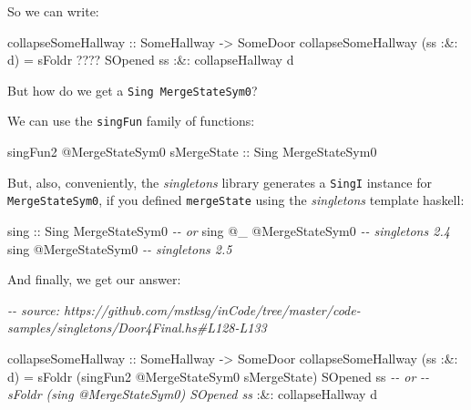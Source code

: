 \documentclass[]{article}
\newenvironment{Shaded}{}{}
\newcommand{\CommentTok}[1]{\textcolor[rgb]{0.38,0.63,0.69}{\textit{#1}}}
\newcommand{\DataTypeTok}[1]{\textcolor[rgb]{0.56,0.13,0.00}{#1}}
\newcommand{\NormalTok}[1]{#1}
\newcommand{\OperatorTok}[1]{\textcolor[rgb]{0.40,0.40,0.40}{#1}}
\newcommand{\OtherTok}[1]{\textcolor[rgb]{0.00,0.44,0.13}{#1}}
\begin{document}
So we can write:

\begin{Shaded}
\begin{Highlighting}[]
\OtherTok{collapseSomeHallway\textquotesingle{}\textquotesingle{} ::} \DataTypeTok{SomeHallway} \OtherTok{{-}\textgreater{}} \DataTypeTok{SomeDoor}
\NormalTok{collapseSomeHallway\textquotesingle{}\textquotesingle{} (ss }\OperatorTok{:\&:}\NormalTok{ d) }\OtherTok{=}\NormalTok{ sFoldr }\OperatorTok{????} \DataTypeTok{SOpened}\NormalTok{ ss}
                               \OperatorTok{:\&:}\NormalTok{ collapseHallwa\textquotesingle{}\textquotesingle{}y d}
\end{Highlighting}
\end{Shaded}

But how do we get a \texttt{Sing\ MergeStateSym0}?

We can use the \texttt{singFun} family of functions:

\begin{Shaded}
\begin{Highlighting}[]
\NormalTok{singFun2 }\OperatorTok{@}\DataTypeTok{MergeStateSym0}\NormalTok{ sMergeState}
\OtherTok{    ::} \DataTypeTok{Sing} \DataTypeTok{MergeStateSym0}
\end{Highlighting}
\end{Shaded}

But, also, conveniently, the \emph{singletons} library generates a
\texttt{SingI} instance for \texttt{MergeStateSym0}, if you defined
\texttt{mergeState} using the \emph{singletons} template haskell:

\begin{Shaded}
\begin{Highlighting}[]
\OtherTok{sing ::} \DataTypeTok{Sing} \DataTypeTok{MergeStateSym0}
\CommentTok{{-}{-} or}
\NormalTok{sing }\OperatorTok{@}\NormalTok{\_ }\OperatorTok{@}\DataTypeTok{MergeStateSym0}         \CommentTok{{-}{-} singletons 2.4}
\NormalTok{sing }\OperatorTok{@}\DataTypeTok{MergeStateSym0}            \CommentTok{{-}{-} singletons 2.5}
\end{Highlighting}
\end{Shaded}

And finally, we get our answer:

\begin{Shaded}
\begin{Highlighting}[]
\CommentTok{{-}{-} source: https://github.com/mstksg/inCode/tree/master/code{-}samples/singletons/Door4Final.hs\#L128{-}L133}

\OtherTok{collapseSomeHallway\textquotesingle{}\textquotesingle{} ::} \DataTypeTok{SomeHallway} \OtherTok{{-}\textgreater{}} \DataTypeTok{SomeDoor}
\NormalTok{collapseSomeHallway\textquotesingle{}\textquotesingle{} (ss }\OperatorTok{:\&:}\NormalTok{ d) }\OtherTok{=}
\NormalTok{        sFoldr (singFun2 }\OperatorTok{@}\DataTypeTok{MergeStateSym0}\NormalTok{ sMergeState) }\DataTypeTok{SOpened}\NormalTok{ ss}
     \CommentTok{{-}{-} or}
     \CommentTok{{-}{-} sFoldr (sing @MergeStateSym0) SOpened ss}
    \OperatorTok{:\&:}\NormalTok{ collapseHallway\textquotesingle{}\textquotesingle{} d}
\end{Highlighting}
\end{Shaded}
\end{document}
